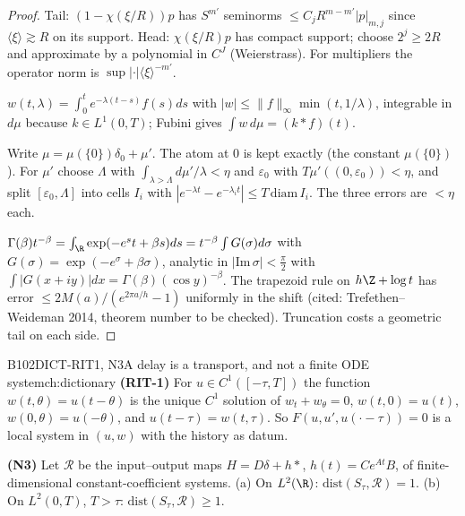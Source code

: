 \begin{proof}
Tail: $(1-\chi(\xi/R))p$ has $S^{m'}$ seminorms $\le C_jR^{m-m'}|p|_{m,j}$ since $\langle\xi\rangle\gtrsim R$ on its support. Head: $\chi(\xi/R)p$ has compact support; choose $2^j\ge2R$ and approximate by a polynomial in $C^J$ (Weierstrass). For multipliers the operator norm is $\sup|\cdot|\langle\xi\rangle^{-m'}$.

$w(t,\lambda)=\int_0^te^{-\lambda(t-s)}f(s)ds$ with $|w|\le\|f\|_\infty\min(t,1/\lambda)$, integrable in $d\mu$ because $k\in L^1(0,T)$; Fubini gives $\int w\,d\mu=(k*f)(t)$.

Write $\mu=\mu(\{0\})\delta_0+\mu'$. The atom at $0$ is kept exactly (the constant $\mu(\{0\})$). For $\mu'$ choose $\Lambda$ with $\int_{\lambda>\Lambda}d\mu'/\lambda<\eta$ and $\varepsilon_0$ with $T\mu'((0,\varepsilon_0))<\eta$, and split $[\varepsilon_0,\Lambda]$ into cells $I_i$ with $|e^{-\lambda t}-e^{-\lambda_it}|\le T\,\mathrm{diam}\,I_i$. The three errors are $<\eta$ each.

$\Gamma(\beta)t^{-\beta}=\int_{\R}\exp(-e^st+\beta s)ds=t^{-\beta}\int G(\sigma)d\sigma$ with $G(\sigma)=\exp(-e^\sigma+\beta\sigma)$, analytic in $|\mathrm{Im}\,\sigma|<\frac\pi2$ with $\int|G(x+iy)|dx=\Gamma(\beta)(\cos y)^{-\beta}$. The trapezoid rule on $h\Z+\log t$ has error $\le2M(a)/(e^{2\pi a/h}-1)$ uniformly in the shift (cited: Trefethen--Weideman 2014, theorem number to be checked). Truncation costs a geometric tail on each side.

\end{proof}

\begin{dimcard}{B102}{DICT-RIT1, N3}{A delay is a transport, and not a finite ODE system}{\pw}{ch:dictionary}
\textbf{(RIT-1)} For $u\in C^1([-\tau,T])$ the function $w(t,\theta)=u(t-\theta)$ is the unique $C^1$ solution of $w_t+w_\theta=0$, $w(t,0)=u(t)$, $w(0,\theta)=u(-\theta)$, and $u(t-\tau)=w(t,\tau)$. So $F(u,u',u(\cdot-\tau))=0$ is a local system in $(u,w)$ with the history as datum.

\textbf{(N3)} Let $\mathcal R$ be the input--output maps $H=D\delta+h*$, $h(t)=Ce^{At}B$, of finite-dimensional constant-coefficient systems. (a) On $L^2(\R)$: $\mathrm{dist}(S_\tau,\mathcal R)=1$. (b) On $L^2(0,T)$, $T>\tau$: $\mathrm{dist}(S_\tau,\mathcal R)\ge1$.
\end{dimcard}

